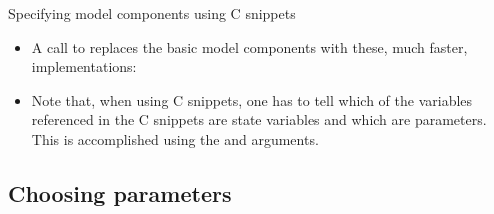 \begin{frame}{Specifying model components using C snippets}
\begin{itemize}
  \item A call to  replaces the basic model components with these, much faster, implementations:

\begin{knitrout}\small
{}\color{fgcolor}
\end{knitrout}
    
  \item Note that, when using C snippets, one has to tell  which of the variables referenced in the C snippets are state variables and which are parameters.
    This is accomplished using the  and  arguments.
    
  \end{itemize}
\end{frame}

\subsection{Choosing parameters}

